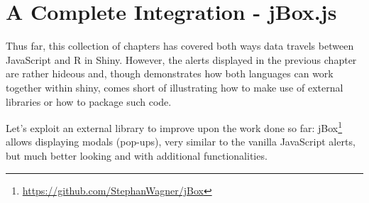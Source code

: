 \documentclass[
]{krantz}
\makeatletter
\newenvironment{Shaded}{\begin{snugshade}}{\end{snugshade}}
\newcommand{\CommentTok}[1]{\textcolor[rgb]{0.37,0.37,0.37}{\textit{#1}}}
\newcommand{\ControlFlowTok}[1]{\textcolor[rgb]{0.27,0.27,0.27}{\textbf{#1}}}
\newcommand{\DataTypeTok}[1]{\textcolor[rgb]{0.27,0.27,0.27}{#1}}
\newcommand{\KeywordTok}[1]{\textcolor[rgb]{0.27,0.27,0.27}{\textbf{#1}}}
\newcommand{\NormalTok}[1]{#1}
\newcommand{\OperatorTok}[1]{\textcolor[rgb]{0.43,0.43,0.43}{\textbf{#1}}}
\newcommand{\StringTok}[1]{\textcolor[rgb]{0.5,0.5,0.5}{#1}}
\renewcommand{\href}[2]{#2\footnote{\url{#1}}}
\newenvironment{kframe}{%
\medskip{}
\setlength{\fboxsep}{.8em}
 \def\at@end@of@kframe{}%
 \ifinner\ifhmode%
  \def\at@end@of@kframe{\end{minipage}}%
  \begin{minipage}{\columnwidth}%
 \fi\fi%
 \def\FrameCommand##1{\hskip\@totalleftmargin \hskip-\fboxsep
 \colorbox{shadecolor}{##1}\hskip-\fboxsep
     \hskip-\linewidth \hskip-\@totalleftmargin \hskip\columnwidth}%
 \MakeFramed {\advance\hsize-\width
   \@totalleftmargin\z@ \linewidth\hsize
   \@setminipage}}%
 {\par\unskip\endMakeFramed%
 \at@end@of@kframe}
\renewenvironment{Shaded}{\begin{kframe}}{\end{kframe}}
\makeatother
\begin{document}
\begin{Shaded}
\end{Shaded}

\hypertarget{a-complete-integration---jbox.js}{%
\chapter{A Complete Integration - jBox.js}\label{a-complete-integration---jbox.js}}

Thus far, this collection of chapters has covered both ways data travels between JavaScript and R in Shiny. However, the alerts displayed in the previous chapter are rather hideous and, though demonstrates how both languages can work together within shiny, comes short of illustrating how to make use of external libraries or how to package such code.

Let's exploit an external library to improve upon the work done so far: \href{https://github.com/StephanWagner/jBox}{jBox} allows displaying modals (pop-ups), very similar to the vanilla JavaScript alerts, but much better looking and with additional functionalities.
\end{document}
